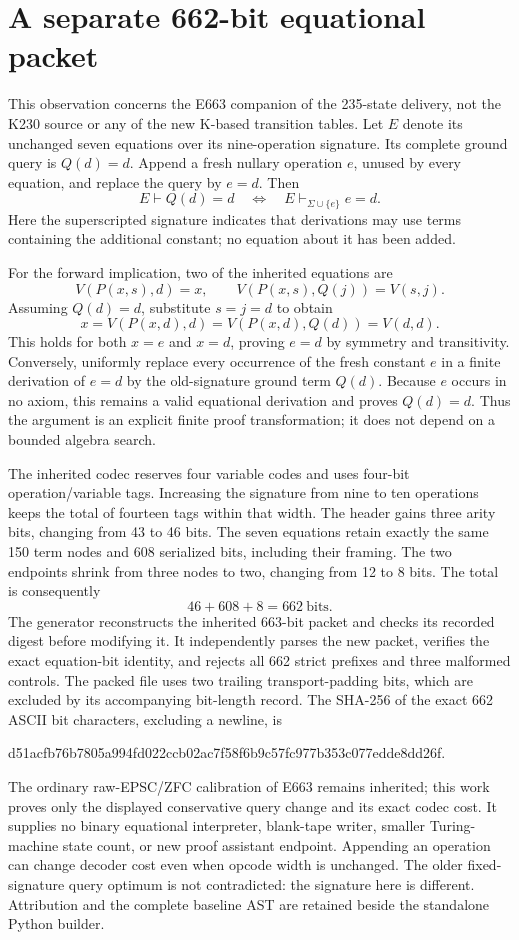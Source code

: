 \section{A separate 662-bit equational packet}
\label{sec:e662}

This observation concerns the E663 companion of the 235-state delivery,
not the K230 source or any of the new K-based transition tables.  Let
$E$ denote its unchanged seven equations over its nine-operation
signature.  Its complete ground query is $Q(d)=d$.
Append a fresh nullary operation $e$, unused by every equation, and
replace the query by $e=d$.  Then
\[
          E\vdash Q(d)=d
          \quad\Longleftrightarrow\quad
          E\vdash_{\Sigma\cup\{e\}} e=d.
\]
Here the superscripted signature indicates that derivations may use
terms containing the additional constant; no equation about it has
been added.

For the forward implication, two of the inherited equations are
\[
 V(P(x,s),d)=x,
 \qquad V(P(x,s),Q(j))=V(s,j).
\]
Assuming $Q(d)=d$, substitute $s=j=d$ to obtain
\[
 x=V(P(x,d),d)=V(P(x,d),Q(d))=V(d,d).
\]
This holds for both $x=e$ and $x=d$, proving $e=d$ by symmetry and
transitivity.  Conversely, uniformly replace every occurrence of
the fresh constant $e$ in a finite derivation of $e=d$ by the
old-signature ground term $Q(d)$.  Because $e$ occurs in no axiom,
this remains a valid equational derivation and proves $Q(d)=d$.
Thus the argument is an explicit finite proof transformation; it
does not depend on a bounded algebra search.

The inherited codec reserves four variable codes and uses four-bit
operation/variable tags.  Increasing the signature from nine to ten
operations keeps the total of fourteen tags within that width.
The header gains three arity bits, changing from 43 to 46 bits.
The seven equations retain exactly the same 150 term nodes and
608 serialized bits, including their framing.  The two endpoints
shrink from three nodes to two, changing from 12 to 8 bits.  The
total is consequently
\[
                    46+608+8=662\ \text{bits}.
\]
The generator reconstructs the inherited 663-bit packet and checks
its recorded digest before modifying it.  It independently parses
the new packet, verifies the exact equation-bit identity, and rejects
all 662 strict prefixes and three malformed controls.  The packed
file uses two trailing transport-padding bits, which are excluded
by its accompanying bit-length record.  The SHA-256 of the exact
662 ASCII bit characters, excluding a newline, is
\begin{center}\scriptsize\ttfamily
d51acfb76b7805a994fd022ccb02ac7f58f6b9c57fc977b353c077edde8dd26f.
\end{center}

The ordinary raw-EPSC/ZFC calibration of E663 remains inherited;
this work proves only the displayed conservative query change and
its exact codec cost.  It supplies no binary equational interpreter,
blank-tape writer, smaller Turing-machine state count, or new proof
assistant endpoint.  Appending an operation can change decoder cost
even when opcode width is unchanged.  The older fixed-signature
query optimum is not contradicted: the signature here is different.
Attribution and the complete baseline AST are retained beside the
standalone Python builder.
